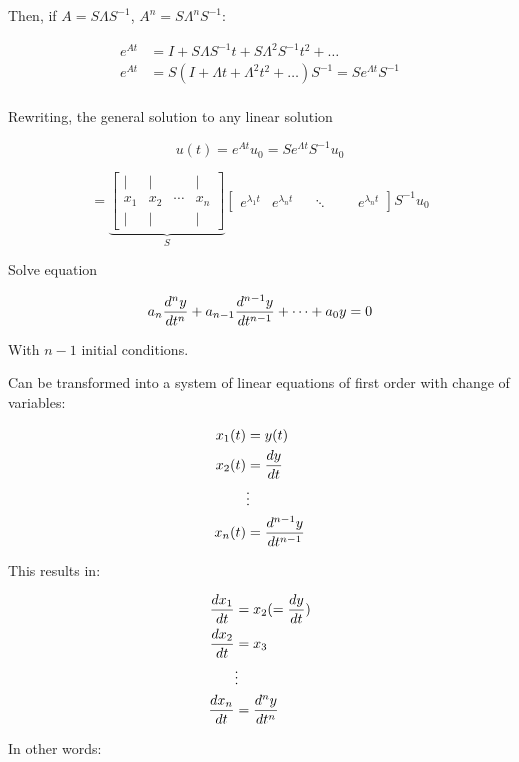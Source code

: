 Then, if $A = S \Lambda S^{-1}$, $A^n = S \Lambda^n S^{-1}$:

\begin{align*}
  e^{At} &= I + S \Lambda S^{-1} t + S \Lambda^2 S^{-1} t^2 + \dots \\
  e^{At} &= S(I + \Lambda t + \Lambda^2 t^2 + \dots) S^{-1} = S e^{\Lambda t} S^{-1} \\
\end{align*}

Rewriting, the general solution to any linear solution

\[
  u(t) = e^{At} u_0 = S e^{\Lambda t} S^{-1} u_0
\]

\[
  =
  \underbrace{
    \begin{bmatrix}
      | & | & & |\\
      x_1 & x_2 & \cdots & x_n\\
      | & | & & | 
    \end{bmatrix}
  }_S
  \begin{bmatrix}
    e^{\lambda_1 t}
    &e^{\lambda_n t}
    & & \ddots
    & & & e^{\lambda_n t}
  \end{bmatrix}
  S^{-1} u_0
\]

Solve equation

\[
  a_n {d^n y \over d t^n} + a_{n-1} {d^{n-1} y \over d t^{n-1}} + \dots + a_0 y = 0
\]

With $n-1$ initial conditions.

Can be transformed into a system of linear equations of first order with change of variables:

\begin{align*}
  x_1(t) &= y(t) \\
  x_2(t) &= {dy \over dt} \\
  &\vdots\\
  x_n(t) &=  {d^{n-1}y \over dt^{n-1}} \\
\end{align*}

This results in:

\begin{align*}
  {d x_1 \over dt} &= x_2 (= {dy \over dt}) \\
  {d x_2 \over dt} &= x_3 \\
  &\vdots \\
  {d x_n \over dt} &= {d^n y \over dt^n} \\
\end{align*}

In other words:

